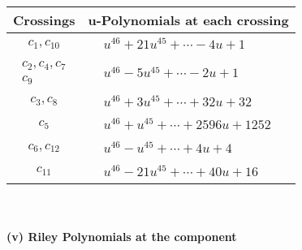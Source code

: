 \documentclass[1p]{elsarticle_modified}
\theoremstyle{definition}
\begin{document}
\begin{tabular}{m{50pt}|m{274pt}}
Crossings & \hspace{64pt}u-Polynomials at each crossing \\
\hline $$\begin{aligned}c_{1},c_{10}\end{aligned}$$&$\begin{aligned}
&u^{46}+21 u^{45}+\cdots-4 u+1
\end{aligned}$\\
\hline $$\begin{aligned}c_{2},c_{4},c_{7}\\c_{9}\end{aligned}$$&$\begin{aligned}
&u^{46}-5 u^{45}+\cdots-2 u+1
\end{aligned}$\\
\hline $$\begin{aligned}c_{3},c_{8}\end{aligned}$$&$\begin{aligned}
&u^{46}+3 u^{45}+\cdots+32 u+32
\end{aligned}$\\
\hline $$\begin{aligned}c_{5}\end{aligned}$$&$\begin{aligned}
&u^{46}+u^{45}+\cdots+2596 u+1252
\end{aligned}$\\
\hline $$\begin{aligned}c_{6},c_{12}\end{aligned}$$&$\begin{aligned}
&u^{46}- u^{45}+\cdots+4 u+4
\end{aligned}$\\
\hline $$\begin{aligned}c_{11}\end{aligned}$$&$\begin{aligned}
&u^{46}-21 u^{45}+\cdots+40 u+16
\end{aligned}$\\
\hline
\end{tabular}\\~\\
\newpage\renewcommand{\arraystretch}{1}
\flushleft \textbf{(v) Riley Polynomials at the component}\newline \\
\end{document}
